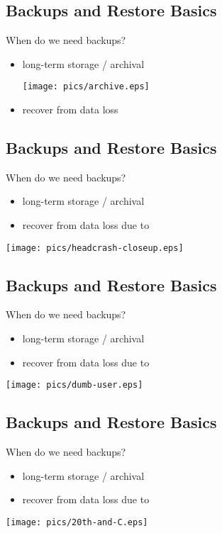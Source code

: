 \documentclass[xga]{xdvislides}
\begin{document}
\subsection{Backups and Restore Basics}
When do we need backups?
\begin{itemize}
	\item long-term storage / archival
\vspace*{\fill}
\begin{center}
	\texttt{[image: pics/archive.eps]}
\end{center}
	\item recover from data loss
\end{itemize}
\vspace*{\fill}

\subsection{Backups and Restore Basics}
When do we need backups?
\begin{itemize}
	\item long-term storage / archival
	\item recover from data loss due to
\end{itemize}
\vspace*{\fill}
\begin{center}
	\texttt{[image: pics/headcrash-closeup.eps]}
\end{center}
\vspace*{\fill}

\subsection{Backups and Restore Basics}
When do we need backups?
\begin{itemize}
	\item long-term storage / archival
	\item recover from data loss due to
\end{itemize}
\vspace*{\fill}
\begin{center}
	\texttt{[image: pics/dumb-user.eps]}
\end{center}
\vspace*{\fill}

\subsection{Backups and Restore Basics}
When do we need backups?
\begin{itemize}
	\item long-term storage / archival
	\item recover from data loss due to
\end{itemize}
\vspace*{\fill}
\begin{center}
	\texttt{[image: pics/20th-and-C.eps]}
\end{center}
\vspace*{\fill}
\end{document}
